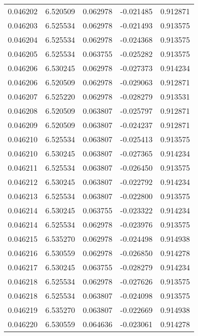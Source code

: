\begin{tabular}{lrrrr}
0.046202    &  6.520509 &  0.062978 & -0.021485 &             0.912871 \\
0.046203    &  6.525534 &  0.062978 & -0.021493 &             0.913575 \\
0.046204    &  6.525534 &  0.062978 & -0.024368 &             0.913575 \\
0.046205    &  6.525534 &  0.063755 & -0.025282 &             0.913575 \\
0.046206    &  6.530245 &  0.062978 & -0.027373 &             0.914234 \\
0.046206    &  6.520509 &  0.062978 & -0.029063 &             0.912871 \\
0.046207    &  6.525220 &  0.062978 & -0.028279 &             0.913531 \\
0.046208    &  6.520509 &  0.063807 & -0.025797 &             0.912871 \\
0.046209    &  6.520509 &  0.063807 & -0.024237 &             0.912871 \\
0.046210    &  6.525534 &  0.063807 & -0.025413 &             0.913575 \\
0.046210    &  6.530245 &  0.063807 & -0.027365 &             0.914234 \\
0.046211    &  6.525534 &  0.063807 & -0.026450 &             0.913575 \\
0.046212    &  6.530245 &  0.063807 & -0.022792 &             0.914234 \\
0.046213    &  6.525534 &  0.063807 & -0.022800 &             0.913575 \\
0.046214    &  6.530245 &  0.063755 & -0.023322 &             0.914234 \\
0.046214    &  6.525534 &  0.062978 & -0.023976 &             0.913575 \\
0.046215    &  6.535270 &  0.062978 & -0.024498 &             0.914938 \\
0.046216    &  6.530559 &  0.062978 & -0.026850 &             0.914278 \\
0.046217    &  6.530245 &  0.063755 & -0.028279 &             0.914234 \\
0.046218    &  6.525534 &  0.062978 & -0.027626 &             0.913575 \\
0.046218    &  6.525534 &  0.063807 & -0.024098 &             0.913575 \\
0.046219    &  6.535270 &  0.063807 & -0.022669 &             0.914938 \\
0.046220    &  6.530559 &  0.064636 & -0.023061 &             0.914278 \\

\end{tabular}
